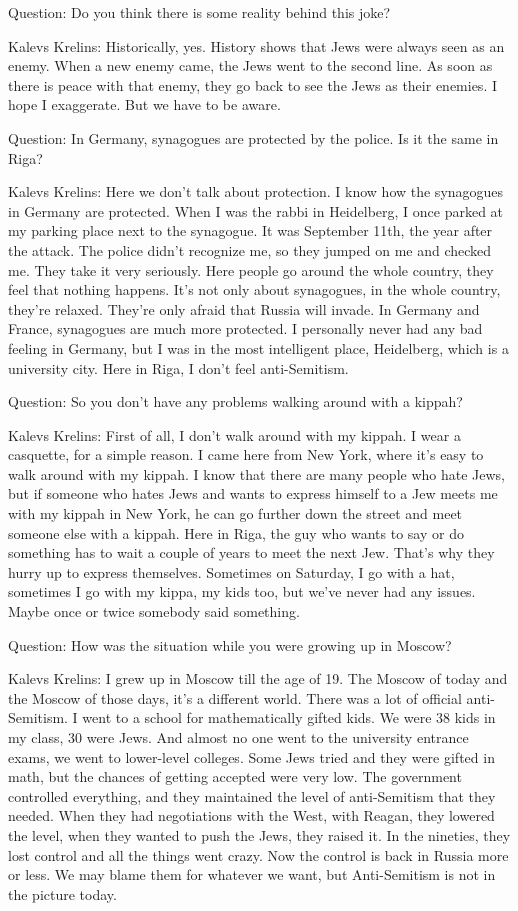 Question: Do you think there is some reality behind this joke?  

Kalevs Krelins: Historically, yes. History shows that Jews were always seen as an enemy. When a new enemy came, the Jews went to the second line. As soon as there is peace with that enemy, they go back to see the Jews as their enemies. I hope I exaggerate. But we have to be aware. 

Question: In Germany, synagogues are protected by the police. Is it the same in Riga? 

Kalevs Krelins: Here we don’t talk about protection. I know how the synagogues in Germany are protected. When I was the rabbi in Heidelberg, I once parked at my parking place next to the synagogue. It was September 11th, the year after the attack. The police didn’t recognize me, so they jumped on me and checked me. They take it very seriously. Here people go around the whole country, they feel that nothing happens. It’s not only about synagogues, in the whole country, they're relaxed. They’re only afraid that Russia will invade. In Germany and France, synagogues are much more protected. I personally never had any bad feeling in Germany, but I was in the most intelligent place, Heidelberg, which is a university city. Here in Riga, I don’t feel anti-Semitism.  

Question: So you don’t have any problems walking around with a kippah? 

Kalevs Krelins: First of all, I don't walk around with my kippah. I wear a casquette, for a simple reason. I came here from New York, where it’s easy to walk around with my kippah. I know that there are many people who hate Jews, but if someone who hates Jews and wants to express himself to a Jew meets me with my kippah in New York, he can go further down the street and meet someone else with a kippah. Here in Riga, the guy who wants to say or do something has to wait a couple of years to meet the next Jew. That’s why they hurry up to express themselves. Sometimes on Saturday, I go with a hat, sometimes I go with my kippa, my kids too, but we've never had any issues. Maybe once or twice somebody said something. 

Question: How was the situation while you were growing up in Moscow? 

Kalevs Krelins: I grew up in Moscow till the age of 19. The Moscow of today and the Moscow of those days, it's a different world. There was a lot of official anti-Semitism. I went to a school for mathematically gifted kids. We were 38 kids in my class, 30 were Jews. And almost no one went to the university entrance exams, we went to lower-level colleges. Some Jews tried and they were gifted in math, but the chances of getting accepted were very low. The government controlled everything, and they maintained the level of anti-Semitism that they needed. When they had negotiations with the West, with Reagan, they lowered the level, when they wanted to push the Jews, they raised it. In the nineties, they lost control and all the things went crazy. Now the control is back in Russia more or less. We may blame them for whatever we want, but Anti-Semitism is not in the picture today. 

